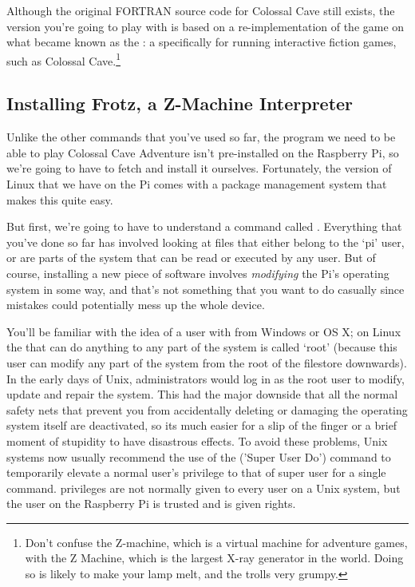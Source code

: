 Although the original FORTRAN source code for Colossal Cave still exists, the version you're going to play with is based on a re-implementation of the game on what became known as the : a  specifically for running interactive fiction games, such as Colossal Cave.\footnote{Don't confuse the Z-machine, which is a virtual machine for adventure games, with the Z Machine, which is the largest X-ray generator in the world. Doing so is likely to make your lamp melt, and the trolls very grumpy.}

\FloatBarrier
\subsection{Installing Frotz, a Z-Machine Interpreter}

Unlike the other commands that you've used so far, the program we need to be able to play Colossal Cave Adventure isn't pre-installed on the Raspberry Pi, so we're going to have to fetch and install it ourselves. Fortunately, the version of Linux that we have on the Pi comes with a package management system that makes this quite easy.

But first, we're going to have to understand a command called . Everything that you've done so far has involved looking at files that either belong to the `pi' user, or are parts of the system that can be read or executed by any user. But of course, installing a new piece of software involves \textit{modifying} the Pi's operating system in some way, and that's not something that you want to do casually since mistakes could potentially mess up the whole device.

You'll be familiar with the idea of a user with  from Windows or OS X; on Linux the  that can do anything to any part of the system is called `root' (because this user can modify any part of the system from the root of the filestore downwards). In the early days of Unix, administrators would log in as the root user to modify, update and repair the system. This had the major downside that all the normal safety nets that prevent you from accidentally deleting or damaging the operating system itself are deactivated, so its much easier for a slip of the finger or a brief moment of stupidity to have disastrous effects. To avoid these problems, Unix systems now usually recommend the use of the  ('Super User Do') command to temporarily elevate a normal user's privilege to that of super user for a single command.  privileges are not normally given to every user on a Unix system, but the user  on the Raspberry Pi is trusted and is given  rights.

